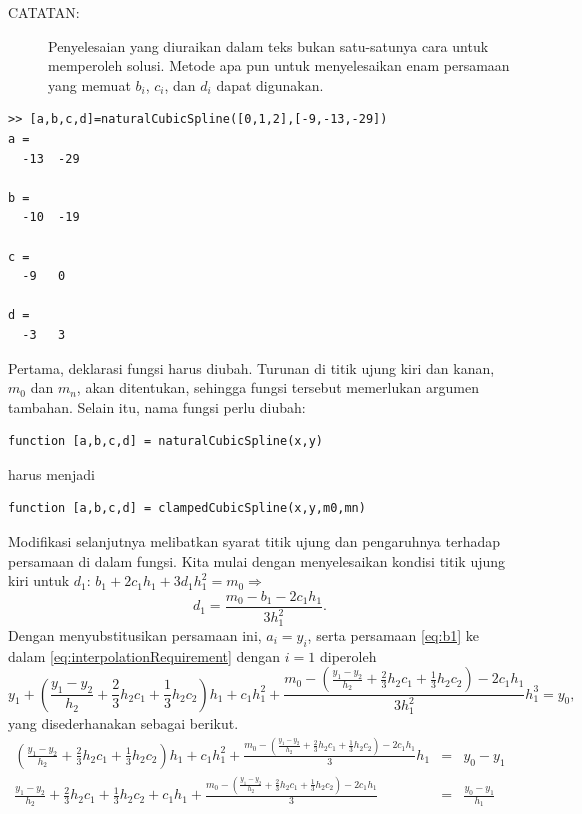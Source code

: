 \begin{description}
\begin{description}
\item [{CATATAN:}] Penyelesaian yang diuraikan dalam teks bukan satu-satunya
cara untuk memperoleh solusi. Metode apa pun untuk menyelesaikan enam
persamaan yang memuat $b_{i}$, $c_{i}$, dan $d_{i}$ dapat digunakan.
\end{description}
\item [{\ref{exc:cubicSplines-14}:}] \begin{verbatim}
>> [a,b,c,d]=naturalCubicSpline([0,1,2],[-9,-13,-29])
a =
  -13  -29

b =
  -10  -19

c =
  -9   0

d =
  -3   3
\end{verbatim}
\item [{\ref{exc:cubicSplines-9}:}] Pertama, deklarasi fungsi harus diubah.
Turunan di titik ujung kiri dan kanan, $m_{0}$ dan $m_{n}$, akan
ditentukan, sehingga fungsi tersebut memerlukan argumen tambahan.
Selain itu, nama fungsi perlu diubah:\begin{verbatim}
function [a,b,c,d] = naturalCubicSpline(x,y)
\end{verbatim}harus menjadi\begin{verbatim}
function [a,b,c,d] = clampedCubicSpline(x,y,m0,mn)
\end{verbatim}Modifikasi selanjutnya melibatkan syarat titik ujung dan pengaruhnya
terhadap persamaan di dalam fungsi. Kita mulai dengan menyelesaikan
kondisi titik ujung kiri untuk $d_{1}$: $b_{1}+2c_{1}h_{1}+3d_{1}h_{1}^{2}=m_{0}\Rightarrow$
\begin{equation}
d_{1}=\frac{m_{0}-b_{1}-2c_{1}h_{1}}{3h_{1}^{2}}.\label{eq:d1}
\end{equation}
Dengan menyubstitusikan persamaan ini, $a_{i}=y_{i}$, serta persamaan
\ref{eq:b1} ke dalam \ref{eq:interpolationRequirement} dengan $i=1$
diperoleh 
\[
y_{1}+\left(\frac{y_{1}-y_{2}}{h_{2}}+\frac{2}{3}h_{2}c_{1}+\frac{1}{3}h_{2}c_{2}\right)h_{1}+c_{1}h_{1}^{2}+\frac{m_{0}-\left(\frac{y_{1}-y_{2}}{h_{2}}+\frac{2}{3}h_{2}c_{1}+\frac{1}{3}h_{2}c_{2}\right)-2c_{1}h_{1}}{3h_{1}^{2}}h_{1}^{3}=y_{0},
\]
yang disederhanakan sebagai berikut.
\begin{eqnarray*}
\left(\frac{y_{1}-y_{2}}{h_{2}}+\frac{2}{3}h_{2}c_{1}+\frac{1}{3}h_{2}c_{2}\right)h_{1}+c_{1}h_{1}^{2}+\frac{m_{0}-\left(\frac{y_{1}-y_{2}}{h_{2}}+\frac{2}{3}h_{2}c_{1}+\frac{1}{3}h_{2}c_{2}\right)-2c_{1}h_{1}}{3}h_{1} & = & y_{0}-y_{1}\\
\frac{y_{1}-y_{2}}{h_{2}}+\frac{2}{3}h_{2}c_{1}+\frac{1}{3}h_{2}c_{2}+c_{1}h_{1}+\frac{m_{0}-\left(\frac{y_{1}-y_{2}}{h_{2}}+\frac{2}{3}h_{2}c_{1}+\frac{1}{3}h_{2}c_{2}\right)-2c_{1}h_{1}}{3} & = & \frac{y_{0}-y_{1}}{h_{1}}\\

\end{eqnarray*}
\end{description}
